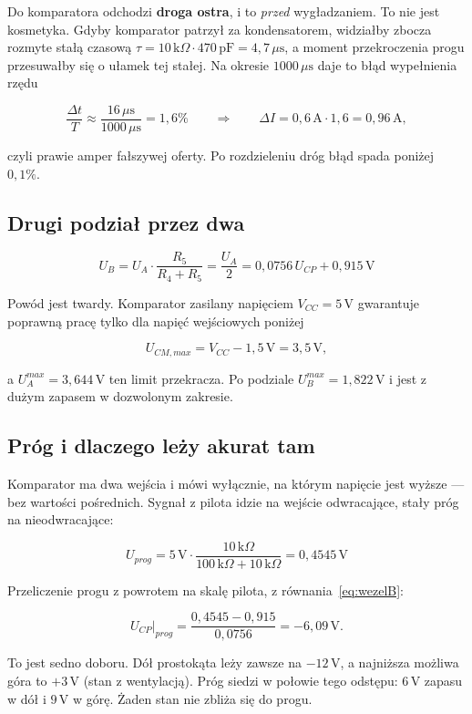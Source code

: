 \documentclass[a4paper,11pt]{article}
\newcommand{\kohm}{\,\mathrm{k}\Omega}
\newcommand{\volt}{\,\mathrm{V}}
\newcommand{\amp}{\,\mathrm{A}}
\newcommand{\us}{\,\mu\mathrm{s}}
\begin{document}
Do komparatora odchodzi \textbf{droga ostra}, i to \emph{przed} wygładzaniem.
To nie jest kosmetyka. Gdyby komparator patrzył za kondensatorem, widziałby zbocza
rozmyte stałą czasową $\tau = 10\kohm\cdot470\,\mathrm{pF}=4{,}7\us$, a moment
przekroczenia progu przesuwałby się o ułamek tej stałej. Na okresie $1000\us$
daje to błąd wypełnienia rzędu

\[
\frac{\Delta t}{T}\approx\frac{16\us}{1000\us}=1{,}6\%
\qquad\Rightarrow\qquad
\Delta I = 0{,}6\amp\cdot1{,}6 = 0{,}96\amp,
\]

czyli prawie amper fałszywej oferty. Po rozdzieleniu dróg błąd spada poniżej
$0{,}1\%$.

\subsection{Drugi podział przez dwa}

\begin{equation}
U_B=U_A\cdot\frac{R_5}{R_4+R_5}=\frac{U_A}{2}=0{,}0756\,U_{CP}+0{,}915\volt
\label{eq:wezelB}
\end{equation}

Powód jest twardy. Komparator zasilany napięciem $V_{CC}=5\volt$ gwarantuje
poprawną pracę tylko dla napięć wejściowych poniżej

\[
U_{CM,max}=V_{CC}-1{,}5\volt=3{,}5\volt ,
\]

a $U_A^{max}=3{,}644\volt$ ten limit przekracza. Po podziale
$U_B^{max}=1{,}822\volt$ i jest z dużym zapasem w dozwolonym zakresie.

\subsection{Próg i dlaczego leży akurat tam}

Komparator ma dwa wejścia i mówi wyłącznie, na którym napięcie jest wyższe --- bez
wartości pośrednich. Sygnał z pilota idzie na wejście odwracające, stały próg na
nieodwracające:

\begin{equation}
U_{prog}=5\volt\cdot\frac{10\kohm}{100\kohm+10\kohm}=0{,}4545\volt
\label{eq:prog}
\end{equation}

Przeliczenie progu z powrotem na skalę pilota, z równania~\eqref{eq:wezelB}:

\[
U_{CP}\big|_{prog}=\frac{0{,}4545-0{,}915}{0{,}0756}=-6{,}09\volt .
\]

To jest sedno doboru. Dół prostokąta leży zawsze na $-12\volt$, a najniższa możliwa
góra to $+3\volt$ (stan z wentylacją). Próg siedzi w połowie tego odstępu: $6\volt$
zapasu w dół i $9\volt$ w górę. Żaden stan nie zbliża się do progu.
\end{document}
